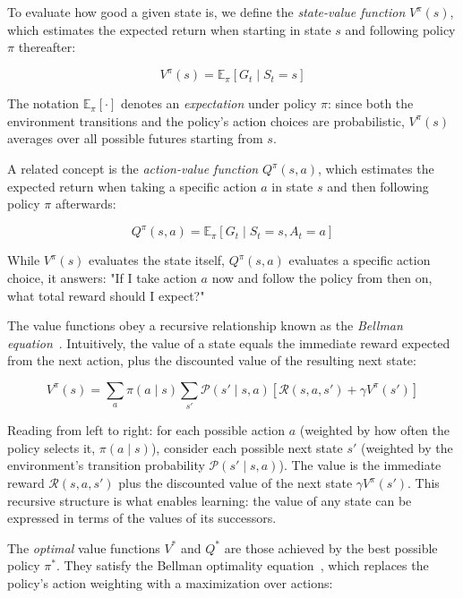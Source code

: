 To evaluate how good a given state is, we define the \textit{state-value function} $V^\pi(s)$, which estimates the expected return when starting in state $s$ and following policy $\pi$ thereafter:

\begin{equation}
    V^\pi(s) = \mathbb{E}_\pi\left[ G_t \mid S_t = s \right]
\end{equation}

The notation $\mathbb{E}_\pi[\cdot]$ denotes an \textit{expectation} under policy $\pi$: since both the environment transitions and the policy's action choices are probabilistic, $V^\pi(s)$ averages over all possible futures starting from $s$.

A related concept is the \textit{action-value function} $Q^\pi(s, a)$, which estimates the expected return when taking a specific action $a$ in state $s$ and then following policy $\pi$ afterwards:

\begin{equation}
    Q^\pi(s, a) = \mathbb{E}_\pi\left[ G_t \mid S_t = s, A_t = a \right]
\end{equation}

While $V^\pi(s)$ evaluates the state itself, $Q^\pi(s, a)$ evaluates a specific action choice, it answers: "If I take action $a$ now and follow the policy from then on, what total reward should I expect?"

The value functions obey a recursive relationship known as the \textit{Bellman equation}~\cite{bellman1957dynamic}. Intuitively, the value of a state equals the immediate reward expected from the next action, plus the discounted value of the resulting next state:

\begin{equation}
    V^\pi(s) = \sum_a \pi(a \mid s) \sum_{s'} \mathcal{P}(s' \mid s, a) \left[ \mathcal{R}(s, a, s') + \gamma V^\pi(s') \right]
\end{equation}

Reading from left to right: for each possible action $a$ (weighted by how often the policy selects it, $\pi(a \mid s)$), consider each possible next state $s'$ (weighted by the environment's transition probability $\mathcal{P}(s' \mid s, a)$). The value is the immediate reward $\mathcal{R}(s, a, s')$ plus the discounted value of the next state $\gamma V^\pi(s')$. This recursive structure is what enables learning: the value of any state can be expressed in terms of the values of its successors.

The \textit{optimal} value functions $V^*$ and $Q^*$ are those achieved by the best possible policy $\pi^*$. They satisfy the Bellman optimality equation~\cite{bellman1957dynamic}, which replaces the policy's action weighting with a maximization over actions:

